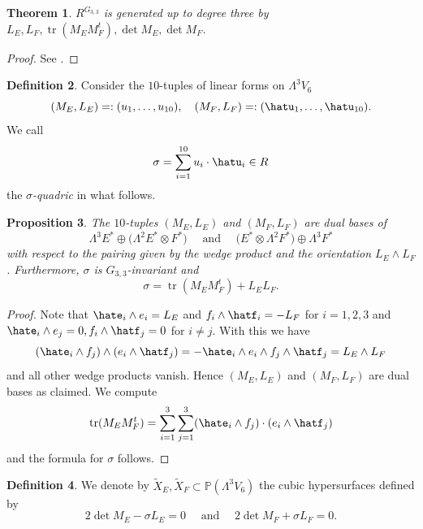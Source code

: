 \documentclass[11pt]{amsart}
\theoremstyle{plain}
\newtheorem{theorem}{Theorem}[section]
\newtheorem{proposition}[theorem]{Proposition}
\numberwithin{equation}{section}
\theoremstyle{definition}
\newtheorem{definition}[theorem]{Definition}
\theoremstyle{remark}
\renewcommand{\P}{\mathbb P}
\DeclareMathOperator{\tr}{tr}
\newcommand{\quadand}{\quad \text{ and } \quad}
\begin{document}
\begin{theorem}\label{tInvariants}
$R^{G_{3,3}}$ is generated up to degree three by $L_E,L_F,\tr(M_E M_F^t), \det M_E, \det M_F$.
\end{theorem}

\begin{proof}
 See \cite[Sections5-8.m2]{MacaulayFiles}.
\end{proof}

\begin{definition}\label{d10Tuples}
Consider the $10$-tuples of linear forms on $\Lambda^3 V_6$
\[
    (M_E,L_E) %
     =: (u_1,\dots,u_{10}),
     \quad
     (M_F,L_F) %
     =: (\hatu_1,\dots,\hatu_{10}). 
\]
We call
\[
        \sigma = \sum_{i=1}^{10} u_i \cdot \hatu_i \in R
\]
the \emph{$\sigma$-quadric} in what follows. 
\end{definition}

\begin{proposition}\label{pDualBases}
The $10$-tuples $(M_E,L_E)$ and $(M_F,L_F)$ 
are dual bases of
\[
    \Lambda^3 E^* \oplus \bigl(\Lambda^2 E^* \otimes F^*\bigr)  
    \quadand
    \bigl( E^* \otimes \Lambda^2 F^* \bigr) \oplus \Lambda^3 F^* 
\]
with respect to the pairing given by the wedge product and the orientation
$L_E \wedge L_F$. Furthermore, $\sigma$ is $G_{3,3}$-invariant and
\[
    \sigma = \tr(M_E M_F^t) + L_EL_F.
\]
\end{proposition}

\begin{proof}
Note that $\hate_i \wedge e_i = L_E$ and $f_i \wedge \hatf_i = -L_F$ for $i=1,2,3$ and $\hate_i \wedge e_j = 0, f_i \wedge \hatf_j = 0$ for $i \not=j$. With this we have
\[
     (\hate_i\wedge f_j) \wedge (e_i\wedge \hatf_j) 
      = -\hate_i\wedge e_i \wedge f_j \wedge \hatf_j 
      = L_E \wedge L_F
\]
and all other wedge products vanish. Hence $(M_E,L_E)$ and $(M_F,L_F)$ are dual bases as claimed. We compute
\[
    \tr(M_E M_F^t) = \sum_{i=1}^3 \sum_{j=1}^3(\hate_i\wedge f_j) \cdot (e_i\wedge \hatf_j)
\]
and the formula for $\sigma$ follows. 
\end{proof}

\begin{definition}\label{dBigCubics}
We denote by $\widetilde{X}_E,\widetilde{X}_F \subset \P(\Lambda^3 V_6)$ the cubic
hypersurfaces defined by
\[
    2\det M_E - \sigma L_E = 0 
    \quadand
    2\det M_F  + \sigma  L_F = 0.
\]
\end{definition}
\end{document}
